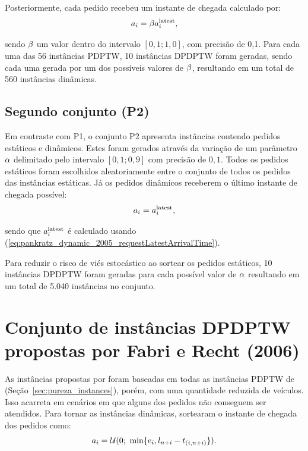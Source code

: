 Posteriormente, cada pedido recebeu um instante de chegada calculado por: 
%
\begin{equation}
  a_i = \beta a{}_{i{}}^{\mathrm{latest}}, 
\end{equation}

\noindent sendo $\beta$ um valor dentro do intervalo $[0{,}1; 1{,}0]$, 
com precisão de 0,1. 
Para cada uma das 56 instâncias PDPTW, 10 instâncias DPDPTW foram geradas, 
sendo cada uma gerada por um dos possíveis valores de $\beta$,
resultando em um total de 560 instâncias dinâmicas.

\subsection{Segundo conjunto (P2)}
Em contraste com P1, o conjunto P2 apresenta instâncias contendo pedidos 
estáticos e dinâmicos. 
Estes foram gerados através da variação de um parâmetro $\alpha$ 
delimitado pelo intervalo $[0,1; 0,9]$ com precisão de $0,1$.
Todos os pedidos estáticos foram escolhidos aleatoriamente entre o conjunto de 
todos os pedidos das instâncias estáticas. Já os pedidos dinâmicos receberem o 
último instante de chegada possível:
%
\begin{equation}
  a_i = a{}_{i{}}^{\mathrm{latest}},
\end{equation}

\noindent sendo que $a{}_{i{}}^{\mathrm{latest}}$ é calculado usando
(\ref{eq:pankratz_dynamic_2005_requestLatestArrivalTime}).

Para reduzir o risco de viés estocástico ao sortear os pedidos estáticos, 10 
instâncias DPDPTW foram geradas para cada possível valor de $\alpha$
resultando em um total de 5.040 instâncias no conjunto.






\section{Conjunto de instâncias DPDPTW propostas por 
         Fabri e Recht (2006)}

As instâncias propostas por \textcite{fabri_dynamic_2006} foram baseadas em
todas as instâncias PDPTW de \textcite{li_metaheuristic_2003} 
(Seção~\ref{sec:pureza_instances}), porém, com uma quantidade reduzida de 
veículos.
Isso acarreta em cenários em que alguns dos pedidos não conseguem ser 
atendidos.
Para tornar as instâncias dinâmicas, \textcite{fabri_dynamic_2006} sortearam 
o instante de chegada dos pedidos como:
%
\begin{equation}
  a_{i} = 
  \mathcal{U}(0;\ \min\{e_i, 
      l_{n + i} 
  - t_{(i,n + i)}\}).
  \label{eq:fabri_dynamic_2006_requestArrivalTime}
\end{equation}

